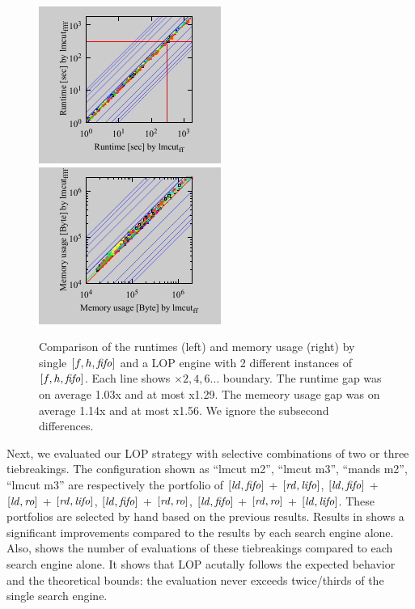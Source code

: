 \begin{figure}[tb]
 \centering {}
 \includegraphics{tables/aaai16-30min/aaai16prelim3/time-nokey-lmcut_ff-lmcut_ffff.pdf}
 \includegraphics{tables/aaai16-30min/aaai16prelim3/mem-nokey-lmcut_ff-lmcut_ffff.pdf}
 \caption{Comparison of the runtimes (left) and memory usage (right) by
 single $[f,h,\mbox{\textit{fifo}}]$ and a LOP engine with 2 different instances of
 $[f,h,\mbox{\textit{fifo}}]$. Each line shows $\times 2,4,6\ldots$ boundary.
 The runtime gap was on average 1.03x and at most x1.29.
 The memeory usage gap was on average 1.14x and at most x1.56.
 We ignore the subsecond differences.}  \label{ffff}
\end{figure}

Next, we evaluated our LOP
strategy with selective combinations of two or three tiebreakings.
The configuration shown as ``lmcut m2'', ``lmcut m3'', ``mands m2'',
``lmcut m3'' are respectively the portfolio of
$[\mbox{\textit{ld}},\mbox{\textit{fifo}}]$ + $[\mbox{\textit{rd}},\mbox{\textit{lifo}}]$, $[\mbox{\textit{ld}},\mbox{\textit{fifo}}]$ + $[\mbox{\textit{ld}},\mbox{\textit{ro}}]$ + $[\mbox{\textit{rd}},\mbox{\textit{lifo}}]$,
$[\mbox{\textit{ld}},\mbox{\textit{fifo}}]$ + $[\mbox{\textit{rd}},\mbox{\textit{ro}}]$, $[\mbox{\textit{ld}},\mbox{\textit{fifo}}]$ + $[\mbox{\textit{rd}},\mbox{\textit{ro}}]$ + $[\mbox{\textit{ld}},\mbox{\textit{lifo}}]$. These
portfolios are selected by hand based on the previous results.
Results in 
shows a significant improvements compared to the results by each search
engine alone.
% 
Also,  shows the number of evaluations of these
tiebreakings compared to each search engine alone.  It shows that
LOP acutally follows the expected behavior and the theoretical
bounds: the evaluation never exceeds twice/thirds of the single
search engine.

